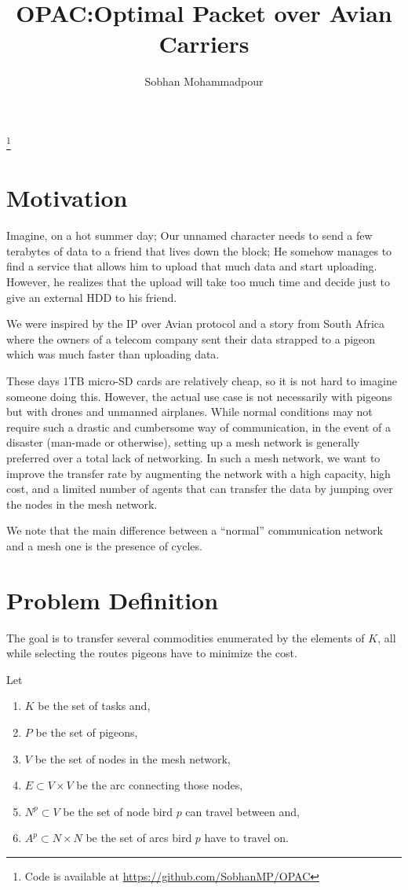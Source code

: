 \documentclass{article}
\author{Sobhan Mohammadpour}
\title{OPAC:\@ Optimal Packet over Avian Carriers}
\newcommand\blfootnote[1]{%
    \begingroup
    \renewcommand\thefootnote{}\footnote{#1}%
    \addtocounter{footnote}{-1}%
    \endgroup
}
\begin{document}
    \maketitle
    \blfootnote{Code is available at \url{https://github.com/SobhanMP/OPAC}}
    \section{Motivation}

    Imagine, on a hot summer day; Our unnamed character needs to send a few terabytes of data to a friend that lives down the block; He somehow manages to find a service that allows him to upload that much data and start uploading. However, he realizes that the upload will take too much time and decide just to give an external HDD to his friend.


    We were inspired by the IP over Avian protocol and a story from South Africa \parencite{abellAfricaPigeonTransfers} where the owners of a telecom company sent their data strapped to a pigeon which was much faster than uploading data.

    These days 1TB micro-SD cards are relatively cheap, so it is not hard to imagine someone doing this. However, the actual use case is not necessarily with pigeons but with drones and unmanned airplanes. While normal conditions may not require such a drastic and cumbersome way of communication, in the event of a disaster (man-made or otherwise), setting up a mesh network is generally preferred over a total lack of networking. In such a mesh network, we want to improve the transfer rate by augmenting the network with a high capacity, high cost, and a limited number of agents that can transfer the data by jumping over the nodes in the mesh network.

    We note that the main difference between a ``normal'' communication network and a mesh one is the presence of cycles.

    \section{Problem Definition}
    The goal is to transfer several commodities enumerated by the elements of $K$, all while selecting the routes pigeons have to minimize the cost.


    Let
    \begin{enumerate}
            \item $K$ be the set of tasks and,
        \item $P$ be the set of pigeons,
        \item $V$ be the set of nodes in the mesh network,
        \item $E \subset V \times V$ be the arc connecting those nodes,
        \item $N^p \subset V$ be the set of node bird $p$ can travel between and,
        \item $A^p \subset N\times N$ be the set of arcs bird $p$ have to travel on.
    \end{enumerate}
\end{document}
